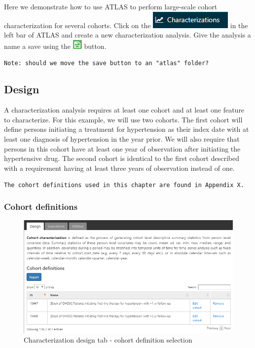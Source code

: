 \documentclass[11pt]{book}
\theoremstyle{definition}
\theoremstyle{definition}
\theoremstyle{definition}
\theoremstyle{remark}
\begin{document}
Here we demonstrate how to use ATLAS to perform large-scale cohort characterization for several cohorts. Click on the \includegraphics{images/Characterization/atlasCharacterizationMenuItem.png} in the left bar of ATLAS and create a new characterization analysis. Give the analysis a name a save using the \includegraphics{images/PopulationLevelEstimation/save.png} button.

\texttt{Note:\ should\ we\ move\ the\ save\ button\ to\ an\ "atlas"\ folder?}

\hypertarget{design}{%
\subsection{Design}\label{design}}

A characterization analysis requires at least one cohort and at least one feature to characterize. For this example, we will use two cohorts. The first cohort will define persons initiating a treatment for hypertension as their index date with at least one diagnosis of hypertension in the year prior. We will also require that persons in this cohort have at least one year of observation after initiating the hypertensive drug. The second cohort is identical to the first cohort described with a requirement having at least three years of observation instead of one.

\texttt{The\ cohort\ definitions\ used\ in\ this\ chapter\ are\ found\ in\ Appendix\ X.}

\hypertarget{cohort-definitions}{%
\subsubsection{Cohort definitions}\label{cohort-definitions}}

\begin{figure}

{\centering \includegraphics[width=1\linewidth]{images/Characterization/atlasCharacterizationCohortSelection} 

}

\caption{Characterization design tab - cohort definition selection}\label{fig:atlasCharacterizationCohortSelection}
\end{figure}
\end{document}
